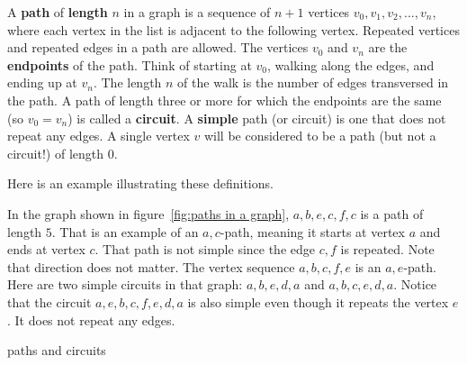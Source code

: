 A {\bfseries path} of {\bfseries {length}} $n$ in a graph is a sequence of $n+1$ vertices
$v_0, v_1, v_2,..., v_n$, where each vertex in the list is adjacent to the following vertex. Repeated vertices and repeated edges in a path are allowed.  The vertices $v_0$ and $v_{n}$ are the {\bfseries endpoints} of the path. Think of starting at $v_0$, walking along the edges, and ending up at $v_n$. The length $n$ of the walk is the number of edges transversed in the path.    A path of length three or more for which the endpoints are the same (so $v_0 = v_n$) is called a {\bfseries circuit}. A {\bfseries simple} path (or circuit) is one that does not repeat any edges. A single vertex $v$ will be considered to be a path (but not a circuit!) of length $0$.



Here is an example illustrating these definitions.

\begin{exmp}
 In the graph shown in figure~\ref{fig:paths in a graph}, 
 $a,b,e,c,f,c$ is a path of length $5$. 
 That is an example of an $a,c${-}path, meaning it starts at vertex $a$ and ends at vertex $c$. 
 That path is not simple since the edge ${c,f}$ is repeated. Note that direction does not matter. 
 The vertex sequence $a,b,c,f,e$ is an $a,e${-}path.  Here are two simple circuits in that graph: $a,b,e,d,a$ and $a,b,c,e,d,a$. Notice that the circuit $a,e,b,c,f,e,d,a$ is also simple even though it repeats the vertex $e$. It does not repeat any edges.  
 
\begin{marginfigure}
\caption{paths and circuits}\label{fig:paths in a graph}
\end{marginfigure}
\end{exmp} 

